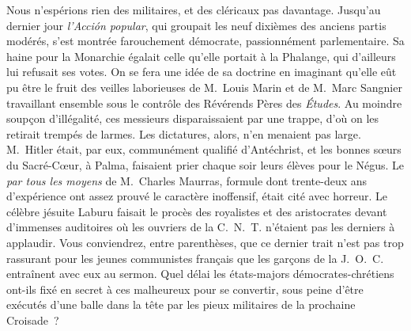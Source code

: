 \documentclass[french,twoside]{book} %
\newcommand{\astertri}{\medskip\par\centerline{\color{rubric}\large\selectfont{\syms ✻\,✻\,✻}}\medskip\par}%
\begin{document}
\noindent Nous n’espérions rien des militaires, et des cléricaux pas davantage. Jusqu’au dernier jour \emph{l’Acción popular}, qui groupait les neuf dixièmes des anciens partis modérés, s’est montrée farouchement démocrate, passionnément parlementaire. Sa haine pour la Monarchie égalait celle qu’elle portait à la Phalange, qui d’ailleurs lui refusait ses votes. On se fera une idée de sa doctrine en imaginant qu’elle eût pu être le fruit des veilles laborieuses de M. Louis Marin et de M. Marc Sangnier travaillant ensemble sous le contrôle des Révérends Pères des \emph{Études}. Au moindre soupçon d’illégalité, ces messieurs disparaissaient par une trappe, d’où on les retirait trempés de larmes. Les dictatures, alors, n’en menaient pas large. M. Hitler était, par eux, communément qualifié d’Antéchrist, et les bonnes sœurs du Sacré-Cœur, à Palma, faisaient prier chaque soir leurs élèves pour le Négus. Le \emph{par tous les moyens} de M. Charles Maurras, formule dont trente-deux ans d’expérience ont assez prouvé le caractère inoffensif, était cité avec horreur. Le célèbre jésuite Laburu faisait le procès des royalistes et des aristocrates devant d’immenses auditoires où les ouvriers de la C. N. T. n’étaient pas les derniers à applaudir. Vous conviendrez, entre parenthèses, que ce dernier trait n’est pas trop rassurant pour les jeunes communistes français que les garçons de la J. O. C. entraînent avec eux au sermon. Quel délai les états-majors démocrates-chrétiens ont-ils fixé en secret à ces malheureux pour se convertir, sous peine d’être exécutés d’une balle dans la tête par les pieux militaires de la prochaine Croisade ?\par

\astertri
\end{document}

